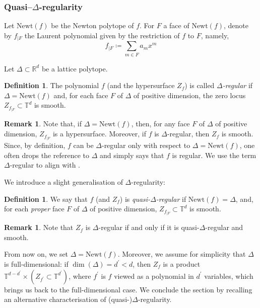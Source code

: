 \documentclass[11pt, reqno]{amsart}
\theoremstyle{plain}
\theoremstyle{definition}
\newtheorem{dfn}[thm]{Definition}
\newtheorem{rem}[thm]{Remark}
\newcommand{\RR}{\mathbb{R}}
\newcommand{\TT}{\mathbb{T}}
\begin{document}
\subsubsection{Quasi--$\Delta$-regularity}
\label{sec:regularity}
Let $\mathrm{Newt}(f)$ be the Newton polytope of $f$. 
For $F$ a face of $\mathrm{Newt}(f)$, denote by $f_{|F}$ the Laurent polynomial given by the restriction of $f$ to $F$, namely,
\begin{equation}
\label{eq:f-F}
f_{|F} \coloneqq \sum_{m \in F} a_m x^m
\end{equation}

Let $\Delta \subset \RR^d$ be 
a lattice polytope. 
\begin{dfn}{\cite[Definition 3.3]{Batyrev-tori}} 
\label{def:Delta} The polynomial $f$  (and the  
hypersurface $Z_f$) is called \emph{$\Delta$-regular} if $\Delta=\mathrm{Newt}(f)$ and, for each face $F$ of $\Delta$ 
of positive dimension, 
the zero locus $Z_{f_{|F}} \subset \TT^d$ is smooth.  
\end{dfn}

\begin{rem}
Note that, if $\Delta=\mathrm{Newt}(f)$, then, for any face $F$ of $\Delta$ 
of positive dimension, $Z_{f_{|F}}$ is a hypersurface. 
Moreover, if $f$ is $\Delta$-regular, then $Z_f$ is smooth. 
Since, by definition, $f$ can be $\Delta$-regular only with respect to $\Delta=\mathrm{Newt}(f)$, one often drops the reference to $\Delta$ and simply says that $f$ is regular. We use the term $\Delta$-regular to align with \cite{Batyrev-tori}. 
\end{rem}

We introduce a slight generalisation of $\Delta$-regularity: 

\begin{dfn} 
\label{def:quasi-Delta}
We say that  $f$ (and $Z_f$) is \emph{quasi-$\Delta$-regular} if  $\mathrm{Newt}(f)=\Delta$, and, for each \emph{proper} face $F$ of $\Delta$  of positive dimension,
$Z_{f_{|F}} \subset \TT^d$ is smooth. 
\end{dfn} 


\begin{rem}
Note that $Z_f$ is $\Delta$-regular if and only if it is quasi-$\Delta$-regular and smooth.
\end{rem}

From now on, we set $\Delta=\mathrm{Newt}(f)$. Moreover, we assume for simplicity that $\Delta$ is full-dimensional: if $\dim(\Delta)=d^\prime < d$, then $Z_f$ is a product  $\TT^{d-d^\prime} \times (Z_{f^\prime} \subset \TT^{d^\prime})$, where $f^\prime$ is $f$ viewed as a polynomial in  $d^\prime$ variables, which brings us back to the full-dimensional case. 
We conclude the section by recalling an alternative characterisation of (quasi-)$\Delta$-regularity. 
\end{document}
